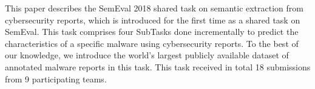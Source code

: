 This paper describes the SemEval 2018 shared task on semantic extraction from cybersecurity reports, which is introduced for the first time as a shared task on SemEval.  This task comprises four SubTasks done incrementally to predict the characteristics of a specific malware using cybersecurity reports. To the best of our knowledge, we introduce the world's largest publicly available dataset of annotated malware reports in this task. This task received in total 18 submissions from 9 participating teams.
